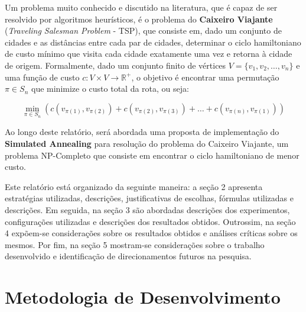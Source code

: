 \documentclass[12pt]{article}
\begin{document}
Um problema muito conhecido e discutido na literatura, que é capaz de ser resolvido por algoritmos heurísticos, é o problema do \textbf{Caixeiro Viajante} (\textit{Traveling Salesman Problem} - TSP), que consiste em, dado um conjunto de cidades e as distâncias entre cada par de cidades, determinar o ciclo hamiltoniano de custo mínimo que visita cada cidade exatamente uma vez e retorna à cidade de origem.
%
Formalmente, dado um conjunto finito de vértices \( V = \{v_1, v_2, \dots, v_n\} \) e uma função de custo \( c: V \times V \to \mathbb{R}^+ \), o objetivo é encontrar uma permutação \( \pi \in S_n \) que minimize o custo total da rota, ou seja:

\begin{equation}
\min_{\pi \in S_n} \left( c(v_{\pi(1)}, v_{\pi(2)}) + c(v_{\pi(2)}, v_{\pi(3)}) + \dots + c(v_{\pi(n)}, v_{\pi(1)}) \right)
\end{equation}

Ao longo deste relatório, será abordada uma proposta de implementação do \textbf{Simulated Annealing} para resolução do problema do Caixeiro Viajante, um problema NP-Completo que consiste em encontrar o ciclo hamiltoniano de menor custo.

Este relatório está organizado da seguinte maneira: a seção 2 apresenta estratégias utilizadas, descrições, justificativas de escolhas, fórmulas utilizadas e descrições. Em seguida, na seção 3 são abordadas descrições dos experimentos, configurações utilizadas e descrições dos resultados obtidos. Outrossim, na seção 4 expõem-se considerações sobre os resultados obtidos e análises críticas sobre os mesmos. Por fim, na seção 5 mostram-se considerações sobre o trabalho desenvolvido e identificação de direcionamentos futuros na pesquisa.


\section{Metodologia de Desenvolvimento}
\label{sec:metodologia_de_desenvolvimento}
\end{document}
